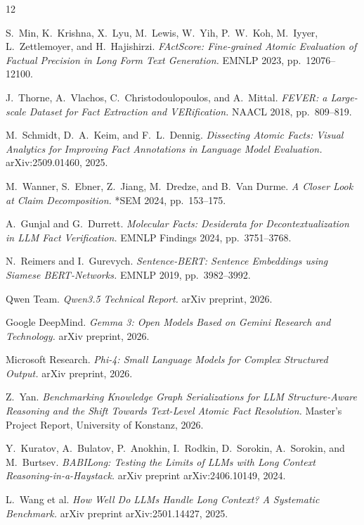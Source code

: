 \documentclass[11pt]{article}
\begin{document}
\begin{thebibliography}{12}

S.~Min, K.~Krishna, X.~Lyu, M.~Lewis, W.~Yih, P.~W.~Koh, M.~Iyyer,
L.~Zettlemoyer, and H.~Hajishirzi.
\textit{FActScore: Fine-grained Atomic Evaluation of Factual Precision in
Long Form Text Generation.} EMNLP 2023, pp.\ 12076--12100.

J.~Thorne, A.~Vlachos, C.~Christodoulopoulos, and A.~Mittal.
\textit{FEVER: a Large-scale Dataset for Fact Extraction and VERification.}
NAACL 2018, pp.\ 809--819.

M.~Schmidt, D.~A.~Keim, and F.~L.~Dennig.
\textit{Dissecting Atomic Facts: Visual Analytics for Improving Fact
Annotations in Language Model Evaluation.} arXiv:2509.01460, 2025.

M.~Wanner, S.~Ebner, Z.~Jiang, M.~Dredze, and B.~Van Durme.
\textit{A Closer Look at Claim Decomposition.}
*SEM 2024, pp.\ 153--175.

A.~Gunjal and G.~Durrett.
\textit{Molecular Facts: Desiderata for Decontextualization in LLM Fact
Verification.} EMNLP Findings 2024, pp.\ 3751--3768.

N.~Reimers and I.~Gurevych.
\textit{Sentence-BERT: Sentence Embeddings using Siamese BERT-Networks.}
EMNLP 2019, pp.\ 3982--3992.

Qwen Team.
\textit{Qwen3.5 Technical Report.}
arXiv preprint, 2026.

Google DeepMind.
\textit{Gemma 3: Open Models Based on Gemini Research and Technology.}
arXiv preprint, 2026.

Microsoft Research.
\textit{Phi-4: Small Language Models for Complex Structured Output.}
arXiv preprint, 2026.

Z.~Yan.
\textit{Benchmarking Knowledge Graph Serializations for LLM Structure-Aware Reasoning 
and the Shift Towards Text-Level Atomic Fact Resolution.}
Master's Project Report, University of Konstanz, 2026.

Y.~Kuratov, A.~Bulatov, P.~Anokhin, I.~Rodkin, D.~Sorokin, A.~Sorokin, and M.~Burtsev.
\textit{BABILong: Testing the Limits of LLMs with Long Context Reasoning-in-a-Haystack.}
arXiv preprint arXiv:2406.10149, 2024.

L.~Wang et al.
\textit{How Well Do LLMs Handle Long Context? A Systematic Benchmark.}
arXiv preprint arXiv:2501.14427, 2025.

\end{thebibliography}
\end{document}
